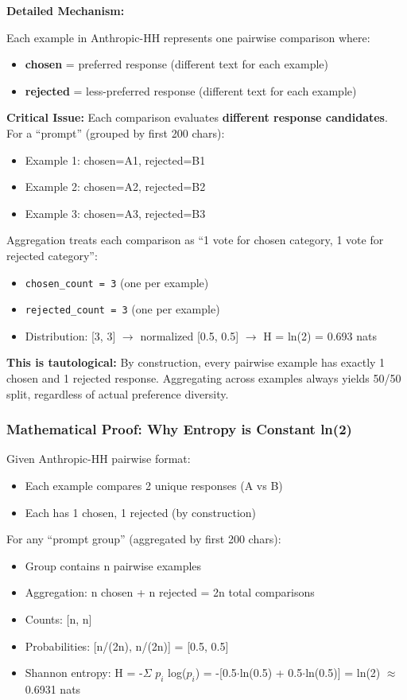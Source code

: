 \textbf{Detailed Mechanism:}

Each example in Anthropic-HH represents one pairwise comparison where:
\begin{itemize}
\item \textbf{chosen} = preferred response (different text for each example)
\item \textbf{rejected} = less-preferred response (different text for each example)
\end{itemize}

\textbf{Critical Issue:} Each comparison evaluates \textbf{different response candidates}. For a ``prompt'' (grouped by first 200 chars):
\begin{itemize}
\item Example 1: chosen=A1, rejected=B1
\item Example 2: chosen=A2, rejected=B2
\item Example 3: chosen=A3, rejected=B3
\end{itemize}

Aggregation treats each comparison as ``1 vote for chosen category, 1 vote for rejected category'':
\begin{itemize}
\item \texttt{chosen\_count = 3} (one per example)
\item \texttt{rejected\_count = 3} (one per example)
\item Distribution: [3, 3] $\rightarrow$ normalized [0.5, 0.5] $\rightarrow$ H = ln(2) = 0.693 nats
\end{itemize}

\textbf{This is tautological:} By construction, every pairwise example has exactly 1 chosen and 1 rejected response. Aggregating across examples always yields 50/50 split, regardless of actual preference diversity.

\subsubsection{Mathematical Proof: Why Entropy is Constant ln(2)}

Given Anthropic-HH pairwise format:
\begin{itemize}
\item Each example compares 2 unique responses (A vs B)
\item Each has 1 chosen, 1 rejected (by construction)
\end{itemize}

For any ``prompt group'' (aggregated by first 200 chars):
\begin{itemize}
\item Group contains n pairwise examples
\item Aggregation: n chosen + n rejected = 2n total comparisons
\item Counts: [n, n]
\item Probabilities: [n/(2n), n/(2n)] = [0.5, 0.5]
\item Shannon entropy: H = -$\Sigma$ $p_i$ log($p_i$) = -[0.5$\cdot$ln(0.5) + 0.5$\cdot$ln(0.5)] = ln(2) $\approx$ 0.6931 nats
\end{itemize}

